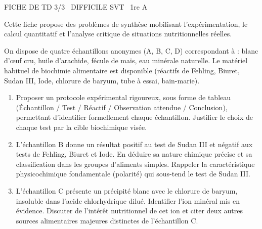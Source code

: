 \documentclass[11pt]{article}
\begin{document}
\begin{tcolorbox}[enhanced,colback=popink,colframe=popink,arc=10pt,boxrule=0pt,left=12pt,right=12pt,top=9pt,bottom=9pt]
{\color{white}\popxbold\small FICHE DE TD 3/3 \textbullet\ DIFFICILE \hfill SVT \textbullet\ 1re A\par}
\end{tcolorbox}
\vspace{4pt}
Cette fiche propose des problèmes de synthèse mobilisant l'expérimentation, le calcul quantitatif et l'analyse critique de situations nutritionnelles réelles.

\begin{exercice}
On dispose de quatre échantillons anonymes (A, B, C, D) correspondant à : blanc d'œuf cru, huile d'arachide, fécule de maïs, eau minérale naturelle. Le matériel habituel de biochimie alimentaire est disponible (réactifs de Fehling, Biuret, Sudan III, Iode, chlorure de baryum, tube à essai, bain-marie).
\begin{enumerate}
    \item Proposer un protocole expérimental rigoureux, sous forme de tableau (Échantillon / Test / Réactif / Observation attendue / Conclusion), permettant d'identifier formellement chaque échantillon. Justifier le choix de chaque test par la cible biochimique visée.
    \item L'échantillon B donne un résultat positif au test de Sudan III et négatif aux tests de Fehling, Biuret et Iode. En déduire sa nature chimique précise et sa classification dans les groupes d'aliments simples. Rappeler la caractéristique physicochimique fondamentale (polarité) qui sous-tend le test de Sudan III.
    \item L'échantillon C présente un précipité blanc avec le chlorure de baryum, insoluble dans l'acide chlorhydrique dilué. Identifier l'ion minéral mis en évidence. Discuter de l'intérêt nutritionnel de cet ion et citer deux autres sources alimentaires majeures distinctes de l'échantillon C.
\end{enumerate}
\end{exercice}
\end{document}
